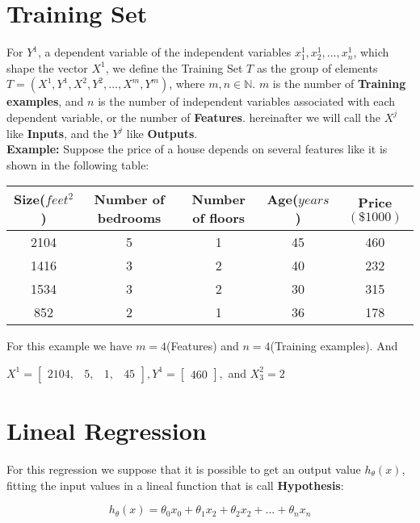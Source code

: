 \documentclass[english]{article}
\begin{document}
\section{Training Set}

For $Y^{1}$, a dependent variable of the independent variables
$x^{1}_{1},x^{1}_{2},...,x^{1}_{n}$, which shape the vector $X^{1}$, we define
the Training Set $T$ as the group of elements
$T=(X^{1},Y^{1},X^{2},Y^{2},...,X^{m},Y^{m})$, where $m,n \in \mathbb{N}$. $m$
is the number of \textbf{Training examples}, and $n$ is the number of
independent variables associated with each dependent variable, or the number of
 \textbf{Features}. hereinafter we will call the $X^{j}$ like \textbf{Inputs},
 and the $Y^{j}$ like \textbf{Outputs}.\\

\textbf{Example:}
Suppose the price of a house depends on several features like it is shown in the
following table:

\begin{center}
\begin{tabular}{ |c|c|c|c|c| }
\hline
Size($feet^{2}$) & Number of bedrooms & Number of floors & Age($years$) &
Price$(\$1000)$ \\
\hline
2104 & 5 & 1 & 45 & 460 \\
1416 & 3 & 2 & 40 & 232 \\
1534 & 3 & 2 & 30 & 315 \\
852  & 2 & 1 & 36 & 178 \\
\hline
\end{tabular}
\end{center}

For this example we have $m=4$(Features) and $n=4$(Training examples). And

$X^{1}=
\begin{bmatrix}
2104, & 5, & 1, & 45
\end{bmatrix},
Y^{1}=
\begin{bmatrix}
460
\end{bmatrix},
$ and $X^{2}_{3}=2$

\section{Lineal Regression}
For this regression we suppose that it is possible to get an output value
$h_{\theta}(x)$, fitting the input values in a lineal function that is call
\textbf{Hypothesis}:

\begin{equation}
h_{\theta}(x)=\theta_{0}x_{0}+\theta_{1}x_{2}+\theta_{2}x_{2}+...+\theta_{n}x_{n}
\end{equation}
\end{document}

